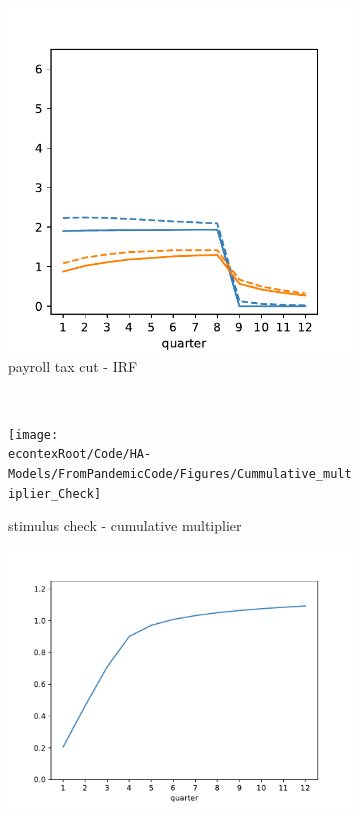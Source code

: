\documentclass[\econtexRoot/HAFiscal]{subfiles}
\begin{document}
\begin{figure}[htb]
\begin{subfigure}[b]{.33\linewidth}
		\notinsubfile{\label{fig:recessionuirelrecession}}
	\end{subfigure}%
	\begin{subfigure}[b]{.33\linewidth}
		\centering
		\includegraphics[width=\linewidth]{Code/HA-Models/FromPandemicCode/Figures/recession_taxcut_relrecession}
		\caption{payroll tax cut - IRF}
		\notinsubfile{\label{fig:recessiontaxcutrelrecession}}
	\end{subfigure}\\
		\begin{subfigure}[b]{.33\linewidth}
		\centering
		\texttt{[image: \\econtexRoot/Code/HA-Models/FromPandemicCode/Figures/Cummulative\_multiplier\_Check]}
		\caption{stimulus check - cumulative multiplier}
		\notinsubfile{\label{fig:recessioncheckrelrecession_Mult}}
	\end{subfigure}%
	\begin{subfigure}[b]{.33\linewidth}
		\centering
		\includegraphics[width=\linewidth]{Code/HA-Models/FromPandemicCode/Figures/Cummulative_multiplier_UI}

\end{subfigure}
\end{figure}
\end{document}
